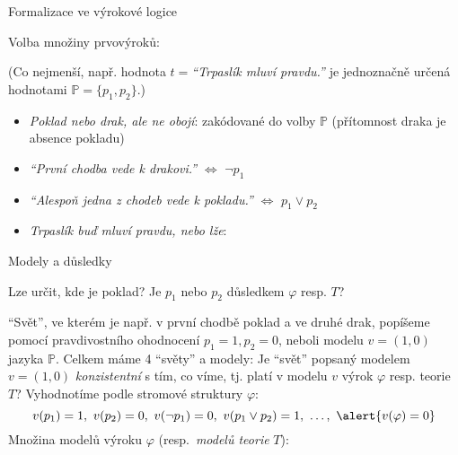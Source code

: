 \documentclass{beamer}
\begin{document}
\begin{frame}{Formalizace ve výrokové logice}

    Volba množiny prvovýroků: 
    

    (Co nejmenší, např. hodnota $t=${\it ``Trpaslík mluví pravdu.''} je jednoznačně určená hodnotami $\mathbb P=\{p_1,p_2\}$.)
    \begin{itemize}
        \item {\it Poklad nebo drak, ale ne obojí}: zakódované do volby $\mathbb P$ (přítomnost draka je absence pokladu)
        \item {\it ``První chodba vede k drakovi.''} $\Leftrightarrow$ \alert{$\neg p_1$}
        \item {\it ``Alespoň jedna z chodeb vede k pokladu.''} $\Leftrightarrow$ \alert{$p_1 \lor p_2$}
        \item {\it Trpaslík buď mluví pravdu, nebo lže}:
    \end{itemize}

    \medskip

\end{frame}


\begin{frame}{Modely a důsledky}

    Lze určit, kde je poklad? Je $p_1$ nebo $p_2$ \alert{důsledkem} $\varphi$ resp. $T$?    

    \alert{``Svět''}, ve kterém je např. v první chodbě poklad a ve druhé drak, popíšeme pomocí \alert{pravdivostního ohodnocení} $p_1=1,p_2=0$, neboli \alert{modelu} $v=(1,0)$ jazyka $\mathbb P$. Celkem máme 4 ``světy'' a modely:
    Je ``svět'' popsaný modelem $v = (1,0)$ \emph{konzistentní} s tím, co víme, tj. \alert{platí} v modelu $v$ výrok $\varphi$ resp. teorie $T$? Vyhodnotíme podle stromové struktury $\varphi$:
    $$
    v(p_1) = 1,\ v(p_2) = 0,\ v(\neg p_1) = 0,\ v(p_1 \lor p_2)=1,\ \dots,\ \alert{v(\varphi)=0}
    $$
    Množina \alert{modelů výroku} \( \varphi \) (resp.\ \emph{modelů teorie} \( T \)):

    
\end{frame}
\end{document}
